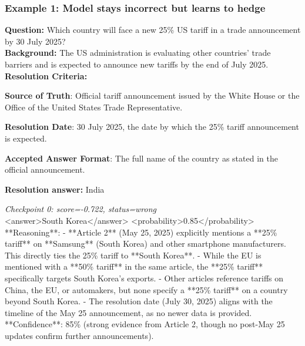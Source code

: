 \documentclass{article} %
\begin{document}
\subsubsection{Example 1: Model stays incorrect but learns to hedge}

\noindent\textbf{Question:} Which country will face a new 25\% US tariff in a trade announcement by 30 July 2025?\\
\noindent\textbf{Background:} The US administration is evaluating other countries' trade barriers and is expected to announce new tariffs by the end of July 2025.\\
\noindent\textbf{Resolution Criteria:}

\textbf{Source of Truth}: Official tariff announcement issued by the White House or the Office of the United States Trade Representative.

\textbf{Resolution Date}: 30 July 2025, the date by which the 25\% tariff announcement is expected.

\textbf{Accepted Answer Format}: The full name of the country as stated in the official announcement.

\noindent\textbf{Resolution answer:} India

\medskip

\noindent\textit{Checkpoint 0: score=-0.722, status=wrong}\\
<answer>South Korea</answer> <probability>0.85</probability> **Reasoning**: - **Article 2** (May 25, 2025) explicitly mentions a **25\% tariff** on **Samsung** (South Korea) and other smartphone manufacturers. This directly ties the 25\% tariff to **South Korea**. - While the EU is mentioned with a **50\% tariff** in the same article, the **25\% tariff** specifically targets South Korea's exports. - Other articles reference tariffs on China, the EU, or automakers, but none specify a **25\% tariff** on a country beyond South Korea. - The resolution date (July 30, 2025) aligns with the timeline of the May 25 announcement, as no newer data is provided. **Confidence**: 85\% (strong evidence from Article 2, though no post-May 25 updates confirm further announcements).

\medskip
\end{document}
